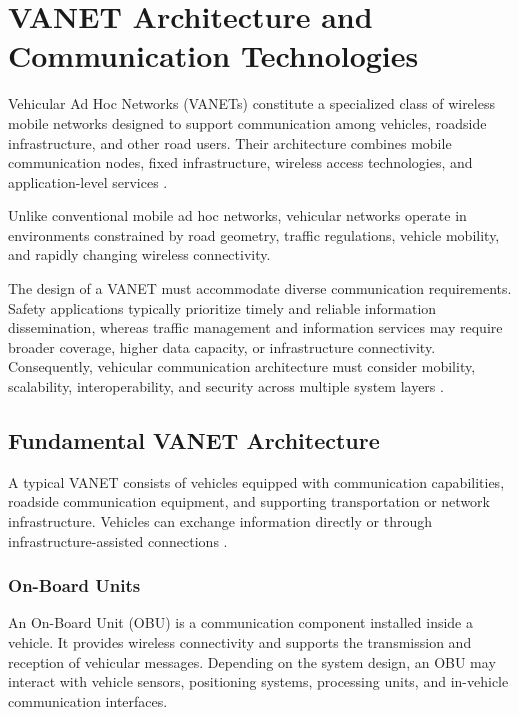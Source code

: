
\section{VANET Architecture and Communication Technologies}
\label{sec:2}

Vehicular Ad Hoc Networks (VANETs) constitute a
specialized class of wireless mobile networks
designed to support communication among vehicles,
roadside infrastructure, and other road users.
Their architecture combines mobile communication
nodes, fixed infrastructure, wireless access
technologies, and application-level services
\cite{Karagiannis2011}.

Unlike conventional mobile ad hoc networks,
vehicular networks operate in environments
constrained by road geometry, traffic regulations,
vehicle mobility, and rapidly changing wireless
connectivity.

The design of a VANET must accommodate diverse
communication requirements. Safety applications
typically prioritize timely and reliable
information dissemination, whereas traffic
management and information services may require
broader coverage, higher data capacity, or
infrastructure connectivity. Consequently,
vehicular communication architecture must
consider mobility, scalability, interoperability,
and security across multiple system layers
\cite{Karagiannis2011}.

\subsection{Fundamental VANET Architecture}
\label{sec:2A}

A typical VANET consists of vehicles equipped
with communication capabilities, roadside
communication equipment, and supporting
transportation or network infrastructure.
Vehicles can exchange information directly
or through infrastructure-assisted connections
\cite{Hartenstein2008}.

\subsubsection{On-Board Units}

An On-Board Unit (OBU) is a communication
component installed inside a vehicle.
It provides wireless connectivity and
supports the transmission and reception
of vehicular messages. Depending on the
system design, an OBU may interact with
vehicle sensors, positioning systems,
processing units, and in-vehicle
communication interfaces.

